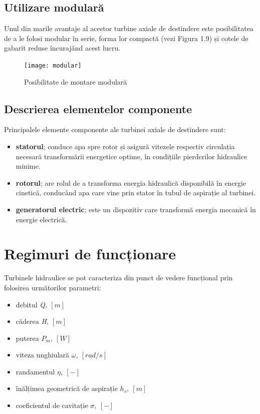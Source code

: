 \clearpage


\subsection{Utilizare modulară}
Unul din marile avantaje al acestor turbine axiale de destindere este posibilitatea de a le folosi modular în serie, forma lor compactă (vezi Figura 1.9) și cotele de gabarit reduse încurajând acest lucru.

\begin{figure}[h!]
	\centering
	\texttt{[image: modular]}
	\caption{Posibilitate de montare modulară \cite{hasmatuchi2014new}}
	\label{Posibilitate de montare modulară}
\end{figure}

\subsection{Descrierea elementelor componente}

Principalele elemente componente ale turbinei axiale de destindere sunt:

\begin{itemize}
	\item \textbf{statorul}; conduce apa spre rotor și asigură vitezele respectiv circulația necesară transformării energetice optime, în condițiile pierderilor hidraulice minime.
	\item \textbf{rotorul}; are rolul de a transforma energia hidraulică disponibilă în energie cinetică, conducând apa care vine prin stator în tubul de aspirație al turbinei.
	\item \textbf{generatorul electric}; este un dispozitiv care transformă energia mecanică în energie electrică.
\end{itemize}


\section{Regimuri de funcționare}

Turbinele hidraulice se pot caracteriza din punct de vedere funcțional prin folosirea următorilor parametri:

\begin{itemize}
	\item debitul \textit{Q, $[\si{m}]$}
	\item căderea \textit{H, $[\si{m}]$}
	\item puterea \textit{$P_m$, $[\si{W}]$}
	\item viteza unghiular\u{a} \textit{\(\omega\), $[\si{rad/s}]$}
	\item randamentul \textit{\(\eta\), $[-]$}
	\item înălțimea geometrică de aspirație \textit{\(h_s\), $[\si{m}]$}
	\item coeficientul de cavitație \textit{\(\sigma\), $[-]$}
\end{itemize}


